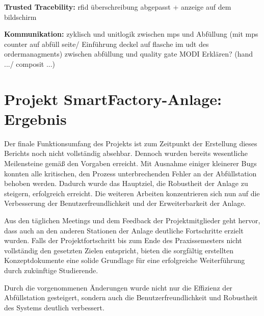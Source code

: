 \textbf{Trusted Tracebility:} 
rfid überschreibung abgepasst + anzeige auf dem bildschirm 

\textbf{Kommunikation:} 
zyklisch und unitlogik zwischen mps und Abfüllung (mit mps counter auf abfüll seite/ Einführung deckel auf flasche im udt des ordermanagments)
zwischen abfüllung und quality gate 
MODI Erklären? (hand .../ composit ...)


\section{Projekt SmartFactory-Anlage: Ergebnis}

Der finale Funktionsumfang des Projekts ist zum Zeitpunkt der Erstellung dieses Berichts noch nicht vollständig absehbar. Dennoch wurden bereits 
wesentliche Meilensteine gemäß den Vorgaben erreicht. Mit Ausnahme einiger kleinerer Bugs konnten alle kritischen, den Prozess unterbrechenden 
Fehler an der Abfüllstation behoben werden. Dadurch wurde das Hauptziel, die Robustheit der Anlage zu steigern, erfolgreich erreicht. Die 
weiteren Arbeiten konzentrieren sich nun auf die Verbesserung der Benutzerfreundlichkeit und der Erweiterbarkeit der Anlage.

Aus den täglichen Meetings und dem Feedback der Projektmitglieder geht hervor, dass auch an den anderen Stationen der Anlage deutliche 
Fortschritte erzielt wurden. Falls der Projektfortschritt bis zum Ende des Praxissemesters nicht vollständig den gesetzten Zielen entspricht, 
bieten die sorgfältig erstellten Konzeptdokumente eine solide Grundlage für eine erfolgreiche Weiterführung durch zukünftige Studierende.

Durch die vorgenommenen Änderungen wurde nicht nur die Effizienz der Abfüllstation gesteigert, sondern auch die Benutzerfreundlichkeit und 
Robustheit des Systems deutlich verbessert.


